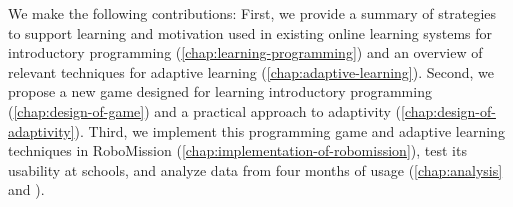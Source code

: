 
We make the following contributions:
First, we provide a summary of strategies to support learning and motivation
used in existing online learning systems for introductory programming
(\cref{chap:learning-programming})
and an overview of relevant techniques for adaptive learning
(\cref{chap:adaptive-learning}).
Second, we propose a new game designed for learning introductory programming
(\cref{chap:design-of-game})
and a practical approach to adaptivity (\cref{chap:design-of-adaptivity}).
Third, we implement this programming game and adaptive learning techniques
in RoboMission (\cref{chap:implementation-of-robomission}),
test its usability at schools, and analyze data from four months of usage
(\cref{chap:analysis} and \cite{robomission,alg.similarity}).


